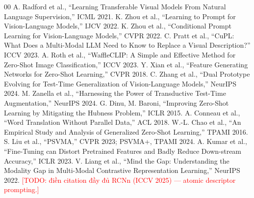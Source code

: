 \documentclass[10pt,twocolumn,letterpaper]{article}
\newcommand{\todo}[1]{\textcolor{red}{[TODO: #1]}}
\begin{document}

\begin{thebibliography}{00}
 A. Radford et al., ``Learning Transferable Visual Models From Natural Language Supervision,'' ICML 2021.
 K. Zhou et al., ``Learning to Prompt for Vision-Language Models,'' IJCV 2022.
 K. Zhou et al., ``Conditional Prompt Learning for Vision-Language Models,'' CVPR 2022.
 C. Pratt et al., ``CuPL: What Does a Multi-Modal LLM Need to Know to Replace a Visual Description?'' ICCV 2023.
 A. Roth et al., ``WaffleCLIP: A Simple and Effective Method for Zero-Shot Image Classification,'' ICCV 2023.
 Y. Xian et al., ``Feature Generating Networks for Zero-Shot Learning,'' CVPR 2018.
 C. Zhang et al., ``Dual Prototype Evolving for Test-Time Generalization of Vision-Language Models,'' NeurIPS 2024.
 M. Zanella et al., ``Harnessing the Power of Transductive Test-Time Augmentation,'' NeurIPS 2024.
 G. Dinu, M. Baroni, ``Improving Zero-Shot Learning by Mitigating the Hubness Problem,'' ICLR 2015.
 A. Conneau et al., ``Word Translation Without Parallel Data,'' ACL 2018.
 W.-L. Chao et al., ``An Empirical Study and Analysis of Generalized Zero-Shot Learning,'' TPAMI 2016.
 S. Liu et al., ``PSVMA,'' CVPR 2023; PSVMA+, TPAMI 2024.
 A. Kumar et al., ``Fine-Tuning can Distort Pretrained Features and Badly Reduce Down-stream Accuracy,'' ICLR 2023.
 V. Liang et al., ``Mind the Gap: Understanding the Modality Gap in Multi-Modal Contrastive Representation Learning,'' NeurIPS 2022.
 \todo{điền citation đầy đủ RCNn (ICCV 2025) — atomic descriptor prompting.}
\end{thebibliography}
\end{document}
